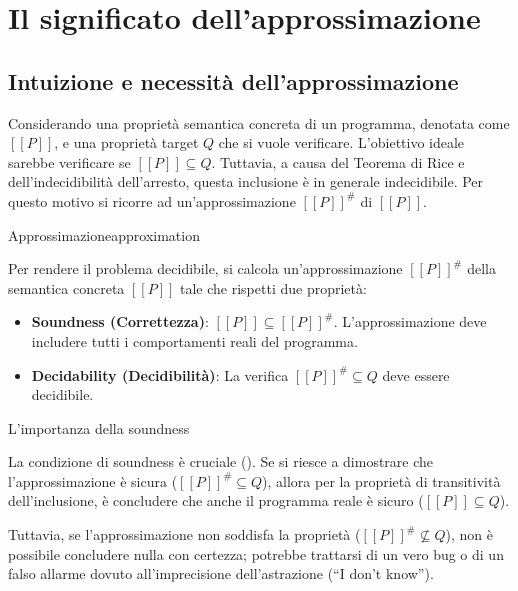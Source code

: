 \section{Il significato dell'approssimazione}

\subsection{Intuizione e necessità dell'approssimazione}

Considerando una proprietà semantica concreta di un programma, denotata come
$[\![P]\!]$, e una proprietà target $Q$ che si vuole verificare.
L'obiettivo ideale sarebbe verificare se $[\![P]\!] \subseteq Q$.
Tuttavia, a causa del Teorema di Rice e dell'indecidibilità dell'arresto,
questa inclusione è in generale indecidibile.
Per questo motivo si ricorre ad un'approssimazione ${[\![P]\!]}^{\#}$ di $[\![P]\!]$.

\begin{definizione}{Approssimazione}{approximation}

    Per rendere il problema decidibile, si calcola un'approssimazione
${[\![P]\!]}^{\#}$ della semantica concreta $[\![P]\!]$ tale che rispetti due proprietà:
\begin{itemize}
    \item \textbf{Soundness (Correttezza)}: $[\![P]\!] \subseteq {[\![P]\!]}^{\#}$.
    L'approssimazione deve includere tutti i comportamenti reali del
    programma.
    \item \textbf{Decidability (Decidibilità)}: La verifica
    ${[\![P]\!]}^{\#} \subseteq Q$ deve essere decidibile.
\end{itemize}

\end{definizione}

\begin{nota}{L'importanza della soundness}{}

La condizione di soundness è cruciale ().
Se si riesce a dimostrare che l'approssimazione è sicura
(${[\![P]\!]}^{\#} \subseteq Q$), allora per la proprietà di transitività
dell'inclusione, è concludere che anche il programma reale è
sicuro ($[\![P]\!] \subseteq Q$).

Tuttavia, se l'approssimazione non soddisfa la proprietà
(${[\![P]\!]}^{\#} \not\subseteq Q$), non è possibile concludere nulla con
certezza; potrebbe trattarsi di un vero bug o di un falso allarme dovuto
all'imprecisione dell'astrazione (``I don't know'').

\end{nota}

